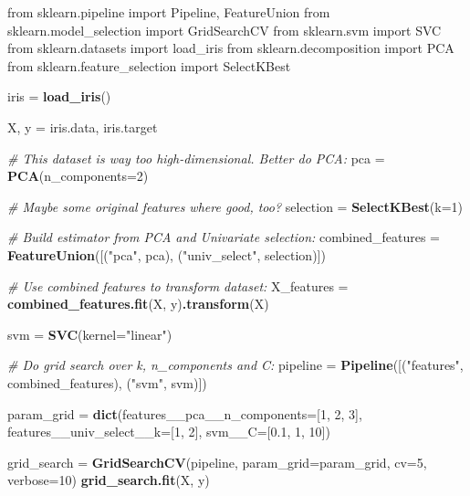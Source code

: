 \documentclass[]{article}
\newenvironment{Shaded}{\begin{snugshade}}{\end{snugshade}}
\newcommand{\CommentTok}[1]{\textcolor[rgb]{0.56,0.35,0.01}{\textit{#1}}}
\newcommand{\DataTypeTok}[1]{\textcolor[rgb]{0.13,0.29,0.53}{#1}}
\newcommand{\DecValTok}[1]{\textcolor[rgb]{0.00,0.00,0.81}{#1}}
\newcommand{\FloatTok}[1]{\textcolor[rgb]{0.00,0.00,0.81}{#1}}
\newcommand{\KeywordTok}[1]{\textcolor[rgb]{0.13,0.29,0.53}{\textbf{#1}}}
\newcommand{\NormalTok}[1]{#1}
\newcommand{\StringTok}[1]{\textcolor[rgb]{0.31,0.60,0.02}{#1}}
\renewenvironment{Shaded} {\begin{snugshade}\small} {\end{snugshade}}
\begin{document}
\begin{Shaded}
\begin{Highlighting}[]
\NormalTok{from sklearn.pipeline import Pipeline, FeatureUnion}
\NormalTok{from sklearn.model_selection import GridSearchCV}
\NormalTok{from sklearn.svm import SVC}
\NormalTok{from sklearn.datasets import load_iris}
\NormalTok{from sklearn.decomposition import PCA}
\NormalTok{from sklearn.feature_selection import SelectKBest}

\NormalTok{iris =}\StringTok{ }\KeywordTok{load_iris}\NormalTok{()}

\NormalTok{X, y =}\StringTok{ }\NormalTok{iris.data, iris.target}

\CommentTok{# This dataset is way too high-dimensional. Better do PCA:}
\NormalTok{pca =}\StringTok{ }\KeywordTok{PCA}\NormalTok{(}\DataTypeTok{n_components=}\DecValTok{2}\NormalTok{)}

\CommentTok{# Maybe some original features where good, too?}
\NormalTok{selection =}\StringTok{ }\KeywordTok{SelectKBest}\NormalTok{(}\DataTypeTok{k=}\DecValTok{1}\NormalTok{)}

\CommentTok{# Build estimator from PCA and Univariate selection:}
\NormalTok{combined_features =}\StringTok{ }\KeywordTok{FeatureUnion}\NormalTok{([(}\StringTok{"pca"}\NormalTok{, pca), (}\StringTok{"univ_select"}\NormalTok{, selection)])}

\CommentTok{# Use combined features to transform dataset:}
\NormalTok{X_features =}\StringTok{ }\KeywordTok{combined_features.fit}\NormalTok{(X, y)}\KeywordTok{.transform}\NormalTok{(X)}

\NormalTok{svm =}\StringTok{ }\KeywordTok{SVC}\NormalTok{(}\DataTypeTok{kernel=}\StringTok{"linear"}\NormalTok{)}

\CommentTok{# Do grid search over k, n_components and C:}
\NormalTok{pipeline =}\StringTok{ }\KeywordTok{Pipeline}\NormalTok{([(}\StringTok{"features"}\NormalTok{, combined_features), (}\StringTok{"svm"}\NormalTok{, svm)])}

\NormalTok{param_grid =}\StringTok{ }\KeywordTok{dict}\NormalTok{(}\DataTypeTok{features__pca__n_components=}\NormalTok{[}\DecValTok{1}\NormalTok{, }\DecValTok{2}\NormalTok{, }\DecValTok{3}\NormalTok{],}
                  \DataTypeTok{features__univ_select__k=}\NormalTok{[}\DecValTok{1}\NormalTok{, }\DecValTok{2}\NormalTok{],}
                  \DataTypeTok{svm__C=}\NormalTok{[}\FloatTok{0.1}\NormalTok{, }\DecValTok{1}\NormalTok{, }\DecValTok{10}\NormalTok{])}

\NormalTok{grid_search =}\StringTok{ }\KeywordTok{GridSearchCV}\NormalTok{(pipeline, }\DataTypeTok{param_grid=}\NormalTok{param_grid, }\DataTypeTok{cv=}\DecValTok{5}\NormalTok{, }\DataTypeTok{verbose=}\DecValTok{10}\NormalTok{)}
\KeywordTok{grid_search.fit}\NormalTok{(X, y)}
\end{Highlighting}
\end{Shaded}
\end{document}
